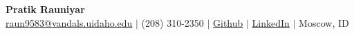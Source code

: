 \documentclass[10pt]{article}
\begin{document}
\small

\begin{center}
    {\bfseries\Large Pratik Rauniyar} \\ [2pt]
    \href{mailto:raun9583@vandals.uidaho.edu}{raun9583@vandals.uidaho.edu} $|$ 
    (208) 310-2350 $|$ 
    \href{https://github.com/prateekrauniyar345}{Github} $|$ 
    \href{https://www.linkedin.com/in/pratik-rauniyar-531a97174/}{LinkedIn} $|$ 
    Moscow, ID
\end{center}
\end{document}
